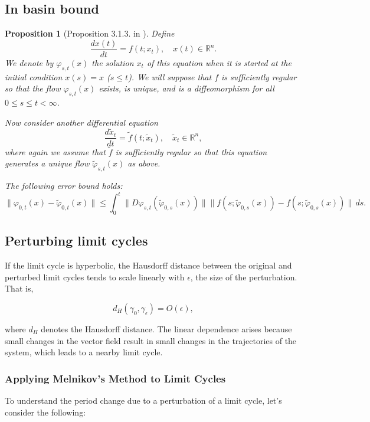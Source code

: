 \documentclass{article}
\newtheorem{proposition}{Proposition}
\theoremstyle{definition}
\theoremstyle{remark}
\begin{document}
\subsection{In basin bound}\label{sec:313}
\begin{proposition}[Proposition 3.1.3. in \citep{vanhandel2007filtering}]\label{prop:313}
Define 
\[
\frac{d x(t)}{d t} = f(t; x_t), \quad x(t) \in \mathbb{R}^n.
\]
We denote by $\varphi_{s,t}(x)$ the solution $x_t$ of this equation when it is started at the initial condition $x(s) = x$ ($s \leq t$). We will suppose that $f$ is sufficiently regular so that the flow $\varphi_{s,t}(x)$ exists, is unique, and is a diffeomorphism for all $0 \leq s \leq t < \infty$.

Now consider another differential equation 
\[
\frac{d \tilde{x}_t}{d t} = \tilde{f}(t; \tilde{x}_t), \quad \tilde{x}_t \in \mathbb{R}^n,
\]
where again we assume that $\tilde{f}$ is sufficiently regular so that this equation generates a unique flow $\tilde{\varphi}_{s,t}(x)$ as above.


The following error bound holds:
\[
\|\varphi_{0,t}(x) - \tilde{\varphi}_{0,t}(x)\| \leq \int_0^t \|D\varphi_{s,t}(\tilde{\varphi}_{0,s}(x))\| \|f(s; \tilde{\varphi}_{0,s}(x)) - f(s; \tilde{\varphi}_{0,s}(x))\| \, ds.
\]
\end{proposition}



\subsection{Perturbing limit cycles}
If the limit cycle is hyperbolic, the Hausdorff distance between the original and perturbed limit cycles tends to scale linearly with \(\epsilon\), the size of the perturbation. That is,

\[
d_H(\gamma_0, \gamma_\epsilon) = O(\epsilon),
\]

where \(d_H\) denotes the Hausdorff distance. The linear dependence arises because small changes in the vector field result in small changes in the trajectories of the system, which leads to a nearby limit cycle.


\subsubsection{Applying Melnikov’s Method to Limit Cycles}

To understand the period change due to a perturbation of a limit cycle, let’s consider the following:
\end{document}
